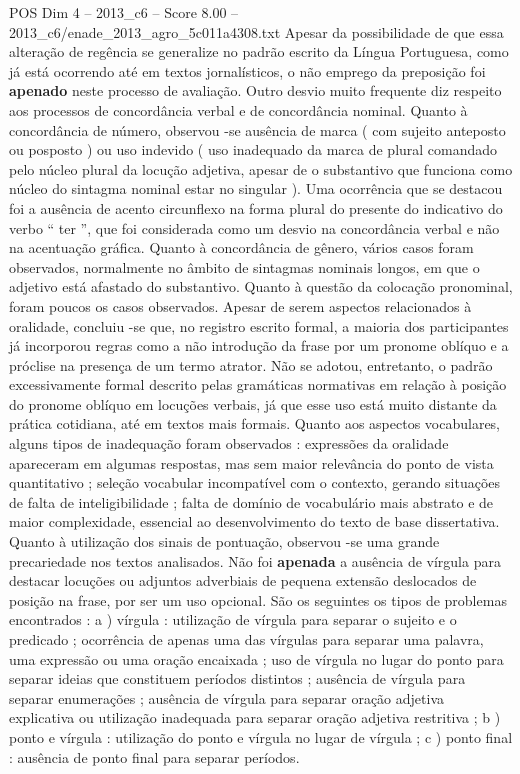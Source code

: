 \begin{textsample}{POS Dim 4 – 2013\_c6 – Score 8.00 – 2013\_c6/enade\_2013\_agro\_5c011a4308.txt}
Apesar da possibilidade de que essa alteração de regência se generalize no padrão escrito da Língua Portuguesa, como já está ocorrendo até em textos jornalísticos, o não emprego da preposição foi \textbf{apenado} neste processo de avaliação.
Outro desvio muito frequente diz respeito aos processos de concordância verbal e de concordância nominal.
Quanto à concordância de número, observou -se ausência de marca ( com sujeito anteposto ou posposto ) ou uso indevido ( uso inadequado da marca de plural comandado pelo núcleo plural da locução adjetiva, apesar de o substantivo que funciona como núcleo do sintagma nominal estar no singular ).
Uma ocorrência que se destacou foi a ausência de acento circunflexo na forma plural do presente do indicativo do verbo “ ter ”, que foi considerada como um desvio na concordância verbal e não na acentuação gráfica.
Quanto à concordância de gênero, vários casos foram observados, normalmente no âmbito de sintagmas nominais longos, em que o adjetivo está afastado do substantivo.
Quanto à questão da colocação pronominal, foram poucos os casos observados.
Apesar de serem aspectos relacionados à oralidade, concluiu -se que, no registro escrito formal, a maioria dos participantes já incorporou regras como a não introdução da frase por um pronome oblíquo e a próclise na presença de um termo atrator.
Não se adotou, entretanto, o padrão excessivamente formal descrito pelas gramáticas normativas em relação à posição do pronome oblíquo em locuções verbais, já que esse uso está muito distante da prática cotidiana, até em textos mais formais.
Quanto aos aspectos vocabulares, alguns tipos de inadequação foram observados : expressões da oralidade apareceram em algumas respostas, mas sem maior relevância do ponto de vista quantitativo ; seleção vocabular incompatível com o contexto, gerando situações de falta de inteligibilidade ; falta de domínio de vocabulário mais abstrato e de maior complexidade, essencial ao desenvolvimento do texto de base dissertativa.
Quanto à utilização dos sinais de pontuação, observou -se uma grande precariedade nos textos analisados.
Não foi \textbf{apenada} a ausência de vírgula para destacar locuções ou adjuntos adverbiais de pequena extensão deslocados de posição na frase, por ser um uso opcional.
São os seguintes os tipos de problemas encontrados : a ) vírgula : utilização de vírgula para separar o sujeito e o predicado ; ocorrência de apenas uma das vírgulas para separar uma palavra, uma expressão ou uma oração encaixada ; uso de vírgula no lugar do ponto para separar ideias que constituem períodos distintos ; ausência de vírgula para separar enumerações ; ausência de vírgula para separar oração adjetiva explicativa ou utilização inadequada para separar oração adjetiva restritiva ; b ) ponto e vírgula : utilização do ponto e vírgula no lugar de vírgula ; c ) ponto final : ausência de ponto final para separar períodos.

\end{textsample}
